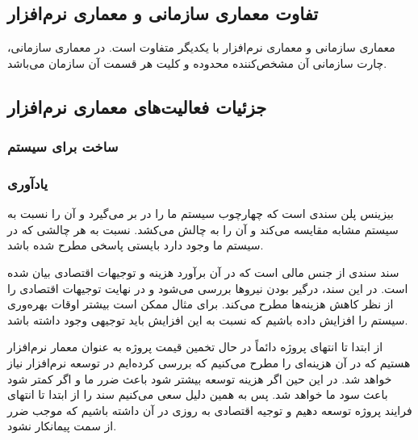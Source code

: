 \subsection{تفاوت معماری سازمانی و معماری نرم‌افزار}

معماری سازمانی و معماری نرم‌افزار با یکدیگر متفاوت است. در معماری سازمانی، چارت
سازمانی آن مشخص‌کننده محدوده و کلیت هر قسمت آن سازمان می‌باشد.





\subsection{جزئیات فعالیت‌های معماری نرم‌افزار}

\subsubsection{ساخت  برای سیستم}

\subsubsection*{یادآوری }
بیزینس پلن سندی است که چهارچوب سیستم ما را در بر می‌گیرد و آن را نسبت به سیستم
مشابه مقایسه می‌کند و آن را به چالش می‌کشد. نسبت به هر چالشی که در سیستم ما وجود
دارد بایستی پاسخی مطرح شده باشد.

سند  سندی از جنس مالی است که در آن برآورد هزینه و توجیهات
اقتصادی بیان شده است. در این سند، درگیر بودن نیرو‌ها بررسی می‌شود و در نهایت
توجیهات‌ اقتصادی را از نظر کاهش هزینه‌ها مطرح می‌کند. برای مثال ممکن است بیشتر
اوقات بهره‌وری سیستم را افزایش داده باشیم که نسبت به این افزایش باید توجیهی وجود
داشته باشد.

از ابتدا تا انتهای پروژه دائماً در حال تخمین قیمت پروژه به عنوان معمار نرم‌افزار
هستیم که در آن هزینه‌ای را مطرح می‌کنیم که بررسی کرده‌ایم در توسعه نرم‌افزار
نیاز خواهد شد. در این حین اگر هزینه توسعه بیشتر شود باعث ضرر ما و اگر کمتر شود
باعث سود ما خواهد شد. پس به همین دلیل سعی می‌کنیم سند  را از
ابتدا تا انتهای فرایند پروژه توسعه دهیم و توجیه اقتصادی به روزی در آن داشته
باشیم که موجب ضرر از سمت پیمانکار نشود.

